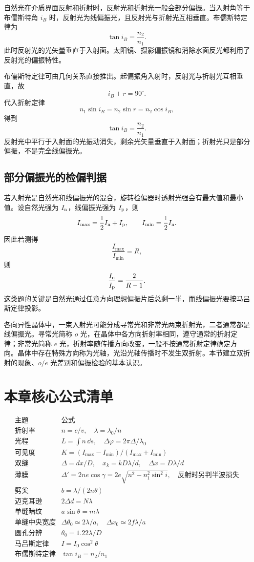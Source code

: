 自然光在介质界面反射和折射时，反射光和折射光一般会部分偏振。当入射角等于布儒斯特角 $i_B$ 时，反射光为线偏振光，且反射光与折射光互相垂直。布儒斯特定律为
\[
  \tan i_B=\frac{n_2}{n_1}.
\]
此时反射光的光矢量垂直于入射面。太阳镜、摄影偏振镜和消除水面反光都利用了反射光的偏振特性。

布儒斯特定律可由几何关系直接推出。起偏振角入射时，反射光与折射光互相垂直，故
\[
  i_B+r=90^\circ.
\]
代入折射定律
\[
  n_1\sin i_B=n_2\sin r=n_2\cos i_B,
\]
得到
\[
  \tan i_B=\frac{n_2}{n_1}.
\]
反射光中平行于入射面的光振动消失，剩余光矢量垂直于入射面；折射光只是部分偏振，不是完全线偏振光。

\subsection*{部分偏振光的检偏判据}

若入射光是自然光和线偏振光的混合，旋转检偏器时透射光强会有最大值和最小值。设自然光强为 $I_{\rm n}$，线偏振光强为 $I_{\rm p}$，则
\[
  I_{\max}=\frac12 I_{\rm n}+I_{\rm p},\qquad
  I_{\min}=\frac12 I_{\rm n}.
\]
因此若测得
\[
  \frac{I_{\max}}{I_{\min}}=R,
\]
则
\[
  \frac{I_{\rm n}}{I_{\rm p}}=\frac{2}{R-1}.
\]
这类题的关键是自然光通过任意方向理想偏振片后总剩一半，而线偏振光要按马吕斯定律投影。

\begin{attention}[双折射]
各向异性晶体中，一束入射光可能分成寻常光和非常光两束折射光，二者通常都是线偏振光。寻常光简称 $o$ 光，在晶体中各方向折射率相同，遵守通常的折射定律；非常光简称 $e$ 光，折射率随传播方向改变，一般不按通常折射定律确定方向。晶体中存在特殊方向称为光轴，光沿光轴传播时不发生双折射。本节建立双折射的现象、$o/e$ 光差别和偏振检验的基本认识。
\end{attention}

\section*{本章核心公式清单}

\[
\begin{array}{c|c}
\text{主题} & \text{公式}\\
\hline
\text{折射率} & n=c/v,\quad \lambda=\lambda_0/n\\
\text{光程} & L=\int n\,\dd s,\quad \Delta\varphi=2\pi\Delta/\lambda_0\\
\text{可见度} & K=(I_{\max}-I_{\min})/(I_{\max}+I_{\min})\\
\text{双缝} & \Delta=dx/D,\quad x_k=kD\lambda/d,\quad \Delta x=D\lambda/d\\
\text{薄膜} & \Delta'=2ne\cos\gamma=2e\sqrt{n^2-n_1^2\sin^2 i},\quad \text{反射时另判半波损失}\\
\text{劈尖} & b=\lambda/(2n\theta)\\
\text{迈克耳逊} & 2\Delta d=N\lambda\\
\text{单缝暗纹} & a\sin\theta=m\lambda\\
\text{单缝中央宽度} & \Delta\theta_0\simeq2\lambda/a,\quad \Delta x_0\simeq2f\lambda/a\\
\text{圆孔分辨} & \theta_0=1.22\lambda/D\\
\text{马吕斯定律} & I=I_0\cos^2\theta\\
\text{布儒斯特定律} & \tan i_B=n_2/n_1
\end{array}
\]
